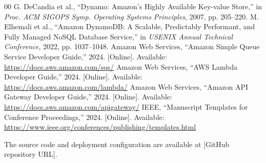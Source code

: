 \documentclass[conference]{IEEEtran}
\begin{document}
\begin{thebibliography}{00}
 G. DeCandia et al., ``Dynamo: Amazon's Highly Available Key-value Store,'' in \emph{Proc. ACM SIGOPS Symp. Operating Systems Principles}, 2007, pp. 205--220.
 M. Elhemali et al., ``Amazon DynamoDB: A Scalable, Predictably Performant, and Fully Managed NoSQL Database Service,'' in \emph{USENIX Annual Technical Conference}, 2022, pp. 1037--1048.
 Amazon Web Services, ``Amazon Simple Queue Service Developer Guide,'' 2024. [Online]. Available: \url{https://docs.aws.amazon.com/sqs/}
 Amazon Web Services, ``AWS Lambda Developer Guide,'' 2024. [Online]. Available: \url{https://docs.aws.amazon.com/lambda/}
 Amazon Web Services, ``Amazon API Gateway Developer Guide,'' 2024. [Online]. Available: \url{https://docs.aws.amazon.com/apigateway/}
 IEEE, ``Manuscript Templates for Conference Proceedings,'' 2024. [Online]. Available: \url{https://www.ieee.org/conferences/publishing/templates.html}
\end{thebibliography}

The source code and deployment configuration are available at [GitHub repository URL].
\end{document}
